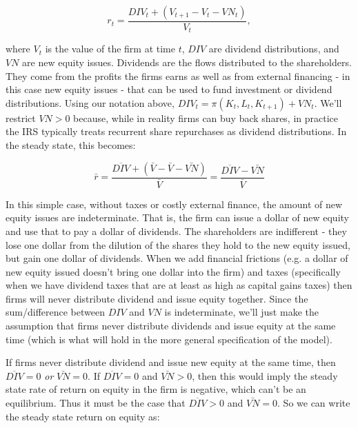\documentclass[letterpaper,12pt]{article}
\theoremstyle{definition}
\begin{document}
\begin{spacing}{1.5}
\begin{equation}
\label{eqn:equity_return}
r_{t} = \frac{DIV_{t}+(V_{t+1}-V_{t}-VN_{t})}{V_{t}},
\end{equation} 

\noindent\noindent where $V_{t}$ is the value of the firm at time $t$, $DIV$ are dividend distributions, and $VN$ are new equity issues.  Dividends are the flows distributed to the shareholders.  They come from the profits the firms earns as well as from external financing - in this case new equity issues - that can be used to fund investment or dividend distributions.  Using our notation above, $DIV_{t}=\pi(K_{t},L_{t},K_{t+1})+VN_{t}$.  We'll restrict $VN>0$ because, while in reality firms can buy back shares, in practice the IRS typically treats recurrent share repurchases as dividend distributions.  In the steady state, this becomes:

\begin{equation}
\label{eqn:equity_return}
\bar{r} = \frac{\overline{DIV}+(\bar{V}-\bar{V}-\bar{VN})}{\bar{V}}=\frac{\overline{DIV}-\bar{VN}}{\bar{V}}
\end{equation} 

\noindent\noindent  In this simple case, without taxes or costly external finance, the amount of new equity issues are indeterminate.  That is, the firm can issue a dollar of new equity and use that to pay a dollar of dividends.  The shareholders are indifferent - they lose one dollar from the dilution of the shares they hold to the new equity issued, but gain one dollar of dividends.  When we add financial frictions (e.g. a dollar of new equity issued doesn't bring one dollar into the firm) and taxes (specifically when we have dividend taxes that are at least as high as capital gains taxes) then firms will never distribute dividend and issue equity together.  Since the sum/difference between $DIV$ and $VN$ is indeterminate, we'll just make the assumption that firms never distribute dividends and issue equity at the same time (which is what will hold in the more general specification of the model).  

If firms never distribute dividend and issue new equity at the same time, then $\overline{DIV}=0$ \emph{or} $\bar{VN}=0$.  If $\overline{DIV}=0$ and $\bar{VN}>0$, then this would imply the steady state rate of return on equity in the firm is negative, which can't be an equilibrium.  Thus it must be the case that $\overline{DIV}>0$ and $\bar{VN}=0$.  So we can write the steady state return on equity as:


\end{spacing}
\end{document}
